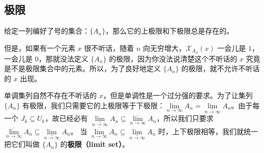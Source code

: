 \subsection{极限}
给定一列编好了号的集合：$\{A_n\}$，那么它的上极限和下极限总是存在的。

但是，如果有一个元素 $x$ 很不听话，随着 $n$ 向无穷增大，$\mathcal{X}_{A_n}(x)$ 一会儿是 $1$，一会儿是 $0$，那就没法定义 $\{A_n\}$ 的极限，因为你没法说清楚这个不听话的 $x$ 究竟是不是极限集合中的元素。所以，为了良好地定义 $\{A_n\}$ 的极限，就不允许不听话的 $x$ 出现。

单调集列自然不存在不听话的 $x$，但是单调性是一个过分强的要求。为了让集列 $\{A_n\}$ 有极限，我们只需要它的上极限等于下极限：$\underset{n\to \infty}{\overline{\lim}} A_n=\underset{n\to \infty}{\underline{\lim}} A_n$。由于每一个 $J_k\subseteq U_k$，故已经必有 $\underset{n\to \infty}{\underline{\lim}} A_n\subseteq \underset{n\to \infty}{\overline{\lim}} A_n$，所以我们只要求 $\underset{n\to \infty}{\overline{\lim}}A_n\subseteq \underset{n\to \infty}{\underline{\lim}} A_n$。
当 $\underset{n\to \infty}{\overline{\lim}} A_n\subseteq \underset{n\to \infty}{\underline{\lim}} A_n$ 时，上下极限相等，我们就统一把它们叫做 $\{A_n\}$ 的\textbf{极限（limit set）}。
